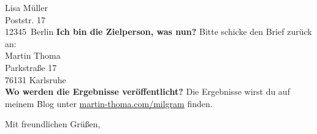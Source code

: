 \documentclass[a4paper, 12pt, KOMAold, sections]{scrlttr2}
\newcommand{\Empfaenger}{Lisa Müller} %
\newcommand{\EStrasse}{Poststr. 17}   %
\newcommand{\EPLZ}{12345}             %
\newcommand{\EOrt}{Berlin}            %
\newcommand{\section}[1]{\noindent\textbf{#1}\newline}
\begin{document}
\begin{letter}{\Empfaenger \\ \EStrasse \\ \EPLZ~\EOrt}
    \section{Ich bin die Zielperson, was nun?}
    Bitte schicke den Brief zurück an:\\

    \noindent Martin Thoma\\
    Parkstraße 17\\
    76131 Karlsruhe\\

    \section{Wo werden die Ergebnisse veröffentlicht?}
    Die Ergebnisse wirst du auf meinem Blog unter \href{http://martin-thoma.com/milgram}{martin-thoma.com/milgram}
    finden.
 
    \closing{Mit freundlichen Grüßen,}
    \end{letter}
\end{document}
